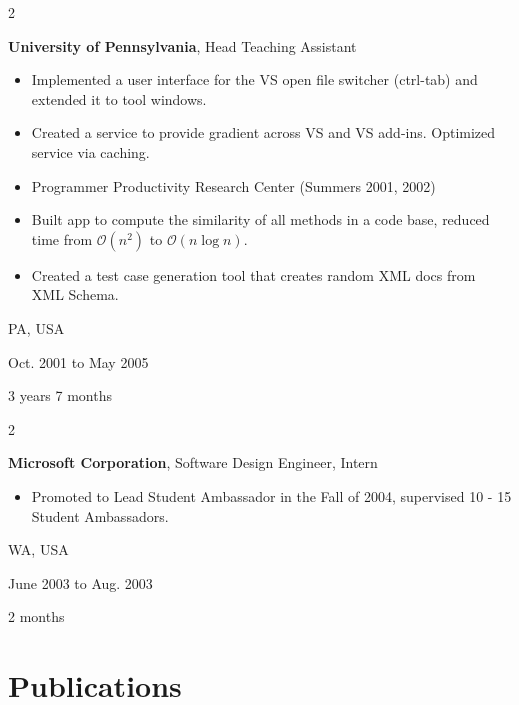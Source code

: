 \documentclass[10pt, letterpaper]{article}
\newenvironment{highlights}{
    \begin{itemize}[
        topsep=0.10 cm,
        parsep=0.10 cm,
        partopsep=0pt,
        itemsep=0pt,
        leftmargin=0.4 cm + 10pt
    ]
}{
    \end{itemize}
} %
\newenvironment{twocolentry}[2][]{
    \onecolentry
    \def\secondColumn{#2}
    \setcolumnwidth{\fill, 4.5 cm}
    \begin{paracol}{2}
}{
    \switchcolumn \raggedleft \secondColumn
    \end{paracol}
    \endonecolentry
} %
\begin{document}
        \vspace{0.2 cm}

        \begin{twocolentry}{
            PA, USA

        Oct. 2001 to May 2005

        3 years 7 months
        }
            \textbf{University of Pennsylvania}, Head Teaching Assistant
            \begin{highlights}
                \item Implemented a user interface for the VS open file switcher (ctrl-tab) and extended it to tool windows.
                \item Created a service to provide gradient across VS and VS add-ins. Optimized service via caching.
                \item Programmer Productivity Research Center (Summers 2001, 2002)
                \item Built app to compute the similarity of all methods in a code base, reduced time from $\mathcal{O}(n^2)$ to $\mathcal{O}(n \log n)$. 
                \item Created a test case generation tool that creates random XML docs from XML Schema.
            \end{highlights}
        \end{twocolentry}


        \vspace{0.2 cm}

        \begin{twocolentry}{
            WA, USA

        June 2003 to Aug. 2003

        2 months
        }
            \textbf{Microsoft Corporation}, Software Design Engineer, Intern
            \begin{highlights}
                \item Promoted to Lead Student Ambassador in the Fall of 2004, supervised 10 - 15 Student Ambassadors.
            \end{highlights}
        \end{twocolentry}



    
    \section{Publications}
\end{document}
